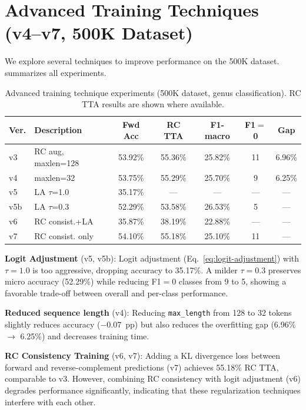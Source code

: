\section{Advanced Training Techniques (v4--v7, 500K Dataset)}
\label{sec:exp-techniques}

We explore several techniques to improve performance on the 500K dataset.  summarizes all experiments.

\begin{table}[htbp]
    \centering
    \caption{Advanced training technique experiments (500K dataset, genus classification). RC TTA results are shown where available.}
    \label{tab:v4-v7}
    \small
    \setlength{\tabcolsep}{4pt}
    \begin{tabular}{llccccc}
        \toprule
        \textbf{Ver.} & \textbf{Description} & \textbf{Fwd Acc} & \textbf{RC TTA} & \textbf{F1-macro} & \textbf{F1$=$0} & \textbf{Gap} \\
        \midrule
        v3 & RC aug, maxlen=128 & 53.92\% & 55.36\% & 25.82\% & 11 & 6.96\% \\
        v4 & maxlen=32 & 53.75\% & 55.29\% & 25.70\% & 9 & 6.25\% \\
        v5 & LA $\tau$=1.0 & 35.17\% & --- & --- & --- & --- \\
        v5b & LA $\tau$=0.3 & 52.29\% & 53.58\% & 26.53\% & 5 & --- \\
        v6 & RC consist.+LA & 35.87\% & 38.19\% & 22.88\% & --- & --- \\
        v7 & RC consist. only & 54.10\% & 55.18\% & 25.10\% & 11 & --- \\
        \bottomrule
    \end{tabular}
\end{table}

\textbf{Logit Adjustment} (v5, v5b): Logit adjustment (Eq.~\ref{eq:logit-adjustment}) with $\tau=1.0$ is too aggressive, dropping accuracy to 35.17\%. A milder $\tau=0.3$ preserves micro accuracy (52.29\%) while reducing F1$=$0 classes from 9 to 5, showing a favorable trade-off between overall and per-class performance.

\textbf{Reduced sequence length} (v4): Reducing \texttt{max\_length} from 128 to 32 tokens slightly reduces accuracy ($-0.07$~pp) but also reduces the overfitting gap (6.96\% $\to$ 6.25\%) and decreases training time.

\textbf{RC Consistency Training} (v6, v7): Adding a KL divergence loss between forward and reverse-complement predictions (v7) achieves 55.18\% RC TTA, comparable to v3. However, combining RC consistency with logit adjustment (v6) degrades performance significantly, indicating that these regularization techniques interfere with each other.

